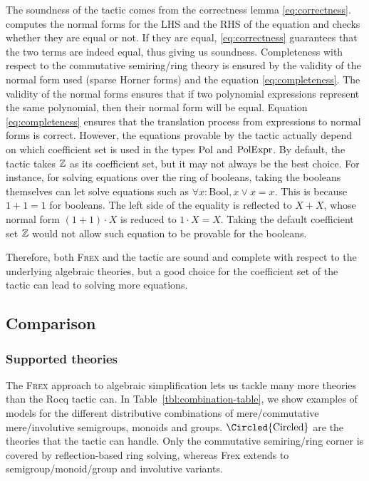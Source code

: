 The soundness of the \ring tactic comes from the correctness lemma \eqref{eq:correctness}. \ring computes the normal forms for the LHS and the RHS of the equation and checks whether they are equal or not. If they are equal, \eqref{eq:correctness} guarantees that the two terms are indeed equal, thus giving us soundness. Completeness with respect to the commutative semiring/ring theory is ensured by the validity of the normal form used (sparse Horner forms) and the equation \eqref{eq:completeness}. The validity of the normal forms ensures that if two polynomial expressions represent the same polynomial, then their normal form will be equal. Equation \eqref{eq:completeness} ensures that the translation process from expressions to normal forms is correct. However, the equations provable by the \ring tactic actually depend on which coefficient set is used in the types $\mathrm{Pol}$ and $\mathrm{PolExpr}$. By default, the \ring tactic takes $\mathbb Z$ as its coefficient set, but it may not always be the best choice. For instance, for solving equations over the ring of booleans, taking the booleans themselves can let \ring solve equations such as $\forall x : \textrm{Bool}, x \vee x = x$. This is because $1 + 1 = 1$ for booleans. The left side of the equality is reflected to $X + X$, whose normal form $(1 + 1)\cdot X$ is reduced to $1 \cdot X = X$. Taking the default coefficient set $\mathbb Z$ would not allow such equation to be provable for the booleans.

Therefore, both \textsc{Frex} and the \ring tactic are sound and complete with respect to the underlying algebraic theories, but a good choice for the coefficient set of the \ring tactic can lead to solving more equations.

\subsection{Comparison}
\label{sec:comparison}

\subsubsection{Supported theories}
\label{sec:supported_theories}

The \textsc{Frex} approach to algebraic simplification lets us tackle many more theories than the Rocq \ring tactic can. In Table~\ref{tbl:combination-table}, we show examples of models for the different distributive combinations of mere/commutative mere/involutive semigroups, monoids and groups. $\Circled{\text{Circled}}$ are the theories that the \ring tactic can handle. Only the commutative semiring/ring corner is covered by reflection-based ring solving, whereas Frex extends to semigroup/monoid/group and involutive variants.

